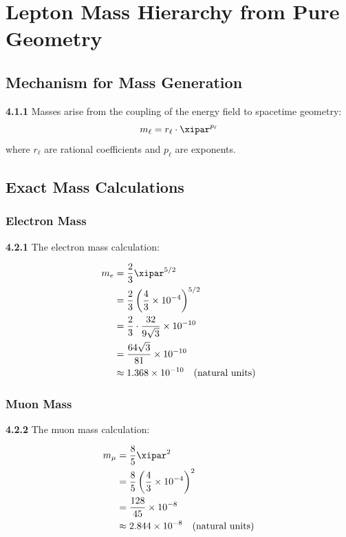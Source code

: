 	\section{Lepton Mass Hierarchy from Pure Geometry}
	
	\subsection{Mechanism for Mass Generation}
	
	\noindent \textbf{4.1.1} Masses arise from the coupling of the energy field to spacetime geometry:
	\begin{equation}
		m_{\ell} = r_{\ell} \cdot \xipar^{p_{\ell}}
	\end{equation}
	where $r_{\ell}$ are rational coefficients and $p_{\ell}$ are exponents.
	
	\subsection{Exact Mass Calculations}
	
	\subsubsection{Electron Mass}
	
	\noindent \textbf{4.2.1} The electron mass calculation:
	\begin{keyresult}
		\begin{align}
			m_e &= \frac{2}{3} \xipar^{5/2} \\
			&= \frac{2}{3} \left( \frac{4}{3} \times 10^{-4} \right)^{5/2} \\
			&= \frac{2}{3} \cdot \frac{32}{9 \sqrt{3}} \times 10^{-10} \\
			&= \frac{64 \sqrt{3}}{81} \times 10^{-10} \\
			&\approx 1.368 \times 10^{-10} \quad \text{(natural units)}
		\end{align}
	\end{keyresult}
	
	\subsubsection{Muon Mass}
	
	\noindent \textbf{4.2.2} The muon mass calculation:
	\begin{keyresult}
		\begin{align}
			m_\mu &= \frac{8}{5} \xipar^{2} \\
			&= \frac{8}{5} \left( \frac{4}{3} \times 10^{-4} \right)^{2} \\
			&= \frac{128}{45} \times 10^{-8} \\
			&\approx 2.844 \times 10^{-8} \quad \text{(natural units)}
		\end{align}
	\end{keyresult}
	

